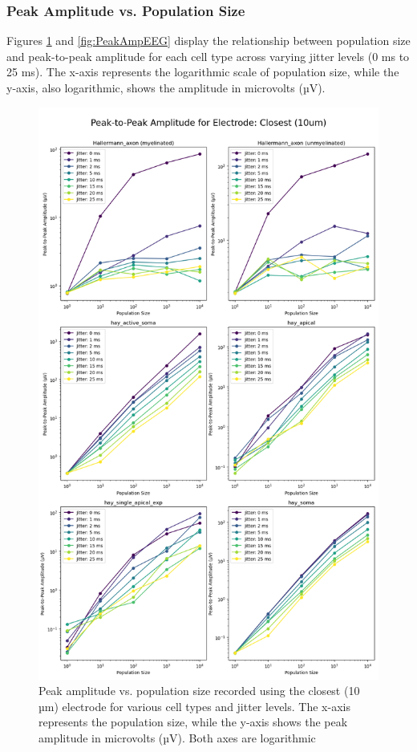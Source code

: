 \documentclass[final, a4paper,masters,en,listoffigures,listoftables,norwegiandates]{NMBU}
\begin{document}
\subsubsection{Peak Amplitude vs. Population Size}

Figures \ref{fig:PeakAmpECoG} and \ref{fig:PeakAmpEEG} display the relationship between population size and peak-to-peak amplitude for each cell type across varying jitter levels (0 ms to 25 ms). The x-axis represents the logarithmic scale of population size, while the y-axis, also logarithmic, shows the amplitude in microvolts (µV).

\begin{figure}[p]
    \vspace*{-3cm}
    \centering
    \includegraphics[width=\textwidth]{Figures/PeakAmpECoG.png}
    \caption{Peak amplitude vs. population size recorded using the closest (10 µm) electrode for various cell types and jitter levels. The x-axis represents the population size, while the y-axis shows the peak amplitude in microvolts (µV). Both axes are logarithmic}
    \label{fig:PeakAmpECoG}
\end{figure}
\end{document}
